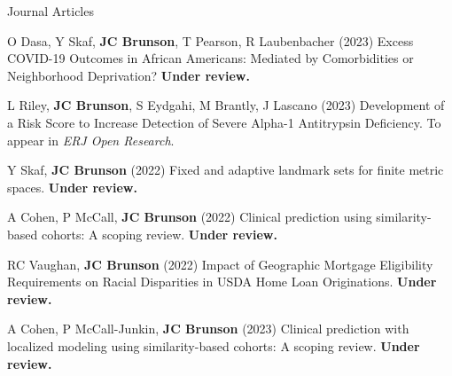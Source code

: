 \documentclass[10pt,a4paper]{article}
\begin{document}

\vspace{.25cm}
{\sc Journal Articles}
\begin{enumerate}[label={[\arabic*]},labelindent=1cm,nolistsep]
\item
O Dasa, Y Skaf, {\bfseries JC Brunson}, T Pearson, R Laubenbacher (2023) Excess COVID-19 Outcomes in African Americans: Mediated by Comorbidities or Neighborhood Deprivation? {\bfseries Under review.}
\item
L Riley, {\bfseries JC Brunson}, S Eydgahi, M Brantly, J Lascano (2023) Development of a Risk Score to Increase Detection of Severe Alpha-1 Antitrypsin Deficiency. To appear in {\itshape ERJ Open Research}.
\item
Y Skaf, {\bfseries JC Brunson} (2022) Fixed and adaptive landmark sets for finite metric spaces. {\bfseries Under review.}
\item
A Cohen, P McCall, {\bfseries JC Brunson} (2022) Clinical prediction using similarity-based cohorts: A scoping review. {\bfseries Under review.}
\item
RC Vaughan, {\bfseries JC Brunson} (2022) Impact of Geographic Mortgage Eligibility Requirements on Racial Disparities in USDA Home Loan Originations. {\bfseries Under review.}
\item
A Cohen, P McCall-Junkin, {\bfseries JC Brunson} (2023) Clinical prediction with localized modeling using similarity-based cohorts: A scoping review. {\bfseries Under review.}

\end{enumerate}
\end{document}
